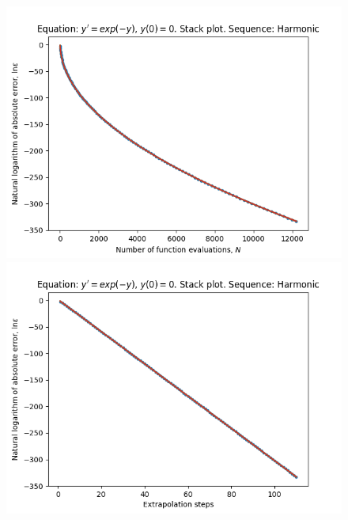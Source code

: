 \begin{figure}[H]
\centering
\begin{minipage}{0.45\textwidth}
\centering
\includegraphics[scale=0.45]{../results/emr_plots/ln_e0_hp_harmonic_stack.png}
\end{minipage}
\begin{minipage}{0.45\textwidth}
\centering
\includegraphics[scale=0.45]{../results/emr_plots/ln_e0_hp_harmonic_steps_stack.png}
\end{minipage}
\end{figure}

